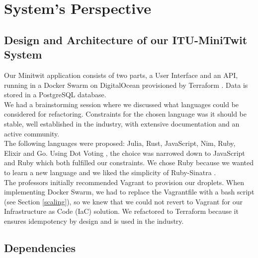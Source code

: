 \section{System's Perspective}
\subsection{Design and Architecture of our ITU-MiniTwit System}

Our Minitwit application consists of two parts, a User Interface and an API, running in a Docker Swarm \cite{docker_swarm_docs} on DigitalOcean \cite{digitalocean_docs} provisioned by Terraform \cite{terraform_docs}. Data is stored in a PostgreSQL \cite{postgresql_official} database. 
\\
We had a brainstorming session where we discussed what languages could be considered for refactoring. 
Constraints for the chosen language was it should be stable, well established in the industry, with extensive documentation and an active community. \\
The following languages were proposed: Julia, Rust, JavaScript, Nim, Ruby, Elixir and Go.
Using Dot Voting \cite{lucid_dot_voting}, the choice was narrowed down to JavaScript and Ruby which both fulfilled our constraints.
We chose Ruby because we wanted to learn a new language and we liked the simplicity of Ruby-Sinatra \cite{sinatra_docs}. \\
The professors initially recommended Vagrant \cite{vagrant_docs} to provision our droplets. When implementing Docker Swarm, we had to replace the Vagrantfile with a bash script (see Section \ref{scaling}), so we knew that we could not revert to Vagrant for our Infrastructure as Code (IaC) solution. We refactored to Terraform because it ensures idempotency by design and is used in the industry.


\subsection{Dependencies} %

